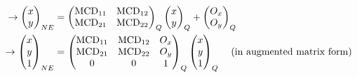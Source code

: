 \documentclass{article}
\begin{document}
\begin{align*}
   \rightarrow
   \begin{pmatrix}
      x \\
      y
   \end{pmatrix}_{NE}
   &=
   \begin{pmatrix}
      \textrm{M}\mathrm{CD}_{11} & \textrm{M}\mathrm{CD}_{12} \\
      \textrm{M}\mathrm{CD}_{21} & \textrm{M}\mathrm{CD}_{22} \\
   \end{pmatrix}_{Q}
   \begin{pmatrix}
      x \\
      y
   \end{pmatrix}_{Q}
   +
   \begin{pmatrix}
      O_x \\
      O_y
   \end{pmatrix}_{Q} \\
   \rightarrow
   \begin{pmatrix}
      x \\
      y \\
      1
   \end{pmatrix}_{NE}
   &=
   \begin{pmatrix}
      \textrm{M}\mathrm{CD}_{11} & \textrm{M}\mathrm{CD}_{12} & O_x \\
      \textrm{M}\mathrm{CD}_{21} & \textrm{M}\mathrm{CD}_{22} & O_y \\
         0     &    0     & 1
   \end{pmatrix}_{Q}
   \begin{pmatrix}
      x \\
      y \\
      1
   \end{pmatrix}_{Q} 
   \;\;\;\; \textrm{(in augmented matrix form)}
\end{align*}
\end{document}
